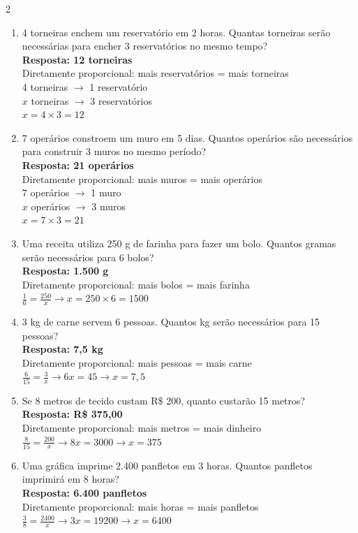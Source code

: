 \documentclass[11pt]{article}
\begin{document}
\begin{multicols}{2}
\begin{enumerate}[leftmargin=*, itemsep=15pt]
\item 4 torneiras enchem um reservatório em 2 horas. Quantas torneiras serão necessárias para encher 3 reservatórios no mesmo tempo? \\
\textbf{Resposta: 12 torneiras} \\
Diretamente proporcional: mais reservatórios = mais torneiras \\
4 torneiras $\rightarrow$ 1 reservatório \\
$x$ torneiras $\rightarrow$ 3 reservatórios \\
$x = 4 \times 3 = 12$

\item 7 operários constroem um muro em 5 dias. Quantos operários são necessários para construir 3 muros no mesmo período? \\
\textbf{Resposta: 21 operários} \\
Diretamente proporcional: mais muros = mais operários \\
7 operários $\rightarrow$ 1 muro \\
$x$ operários $\rightarrow$ 3 muros \\
$x = 7 \times 3 = 21$

\item Uma receita utiliza 250 g de farinha para fazer um bolo. Quantos gramas serão necessários para 6 bolos? \\
\textbf{Resposta: 1.500 g} \\
Diretamente proporcional: mais bolos = mais farinha \\
$\frac{1}{6} = \frac{250}{x} \rightarrow x = 250 \times 6 = 1500$

\item 3 kg de carne servem 6 pessoas. Quantos kg serão necessários para 15 pessoas? \\
\textbf{Resposta: 7,5 kg} \\
Diretamente proporcional: mais pessoas = mais carne \\
$\frac{6}{15} = \frac{3}{x} \rightarrow 6x = 45 \rightarrow x = 7,5$

\item Se 8 metros de tecido custam R\$ 200, quanto custarão 15 metros? \\
\textbf{Resposta: R\$ 375,00} \\
Diretamente proporcional: mais metros = mais dinheiro \\
$\frac{8}{15} = \frac{200}{x} \rightarrow 8x = 3000 \rightarrow x = 375$

\item Uma gráfica imprime 2.400 panfletos em 3 horas. Quantos panfletos imprimirá em 8 horas? \\
\textbf{Resposta: 6.400 panfletos} \\
Diretamente proporcional: mais horas = mais panfletos \\
$\frac{3}{8} = \frac{2400}{x} \rightarrow 3x = 19200 \rightarrow x = 6400$


\end{enumerate}
\end{multicols}
\end{document}
